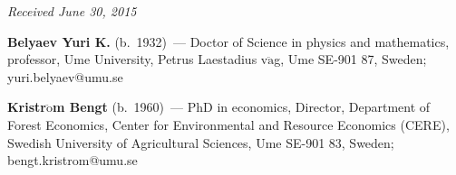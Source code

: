 \vspace*{-10pt}

\hfill{\small\textit{Received June 30, 2015}}

\vspace*{-18pt}

\Contr

\vspace*{-3pt}

\noindent
\textbf{Belyaev Yuri K.} (b.\ 1932)~--- Doctor of Science in physics and mathematics,
professor, 
\mbox{Ume{\!\!\fontsize{12pt}{12pt}\selectfont{}}} 
University,  Petrus Laestadius v$\ddot{\mbox{a}}$g,
\mbox{Ume{\!\!\fontsize{12pt}{12pt}\selectfont{}}} SE-901 87, 
Sweden;  yuri.belyaev@umu.se


\noindent
\textbf{Kristr$\ddot{\mbox{o}}$m Bengt} (b.\ 1960)~--- 
PhD in economics, Director, Department of Forest Economics, Center for Environmental and 
Resource Economics (CERE), Swedish University of Agricultural Sciences,
\mbox{Ume\!} SE-901 83, 
Sweden;  bengt.kristrom@umu.se






\newpage

\vspace*{-24pt}




\def\tit{АНАЛИЗ ОБЗОРНЫХ ОБСЛЕДОВАНИЙ, СОДЕРЖАЩИХ ЦЕНЗУРИРОВАННЫЕ ДАННЫЕ В~ОКРУГЛЕННЫХ ИНТЕРВАЛАХ}

\def\aut{Ю.\,К.~Беляев$^1$, Б.~Кристрём$^2$}


\def\titkol{Анализ обзорных обследований, содержащих цензурированные данные 
в округленных интервалах}

\def\autkol{Ю.\,К.~Беляев, Б.~Кристрём}




